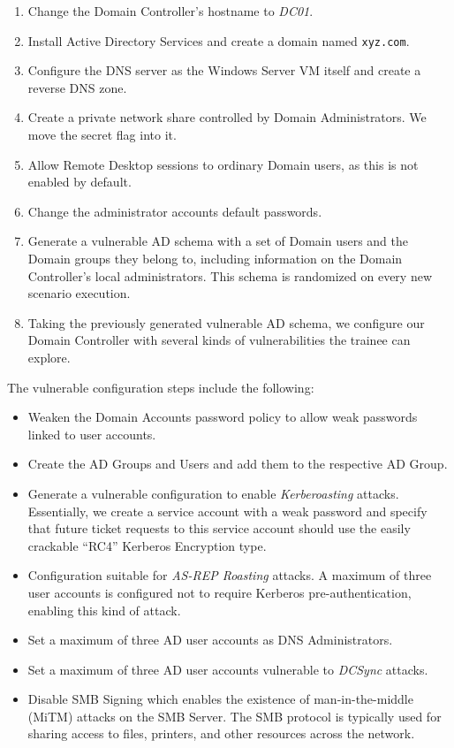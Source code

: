 \begin{enumerate}
    \item Change the Domain Controller's hostname to \textit{DC01}.
    \item Install Active Directory Services and create a domain named \texttt{xyz.com}.
    \item Configure the DNS server as the Windows Server VM itself and create a reverse DNS zone.
    \item Create a private network share controlled by Domain Administrators. We move the secret flag into it.
    \item Allow Remote Desktop sessions to ordinary Domain users, as this is not enabled by default.
    \item Change the administrator accounts default passwords.
    \item Generate a vulnerable AD schema with a set of Domain users and the Domain groups they belong to, including information on the Domain Controller's local administrators. This schema is randomized on every new scenario execution.
    \item Taking the previously generated vulnerable AD schema, we configure our Domain Controller with several kinds of vulnerabilities the trainee can explore.
\end{enumerate}

The vulnerable configuration steps include the following:

\begin{itemize}
    \item Weaken the Domain Accounts password policy to allow weak passwords linked to user accounts.
    \item Create the AD Groups and Users and add them to the respective AD Group.
    \item Generate a vulnerable configuration to enable \textit{Kerberoasting} attacks. Essentially, we create a service account with a weak password and specify that future ticket requests to this service account should use the easily crackable ``RC4'' Kerberos Encryption type.
    \item Configuration suitable for \textit{AS-REP Roasting} attacks. A maximum of three user accounts is configured not to require Kerberos pre-authentication, enabling this kind of attack.
    \item Set a maximum of three AD user accounts as DNS Administrators.
    \item Set a maximum of three AD user accounts vulnerable to \textit{DCSync} attacks.
    \item Disable SMB Signing which enables the existence of man-in-the-middle (MiTM) attacks on the SMB Server. The SMB protocol is typically used for sharing access to files, printers, and other resources across the network.
\end{itemize}

